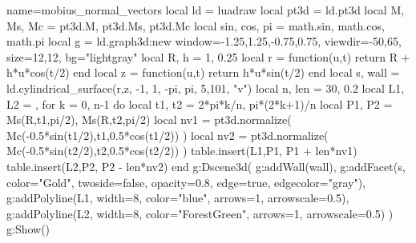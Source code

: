 \documentclass{standalone} %
\begin{document}
\begin{luadraw}{name=mobius_normal_vectors}
local ld = luadraw
local pt3d = ld.pt3d
local M, Ms, Mc = pt3d.M, pt3d.Ms, pt3d.Mc
local sin, cos, pi = math.sin, math.cos, math.pi
local g = ld.graph3d:new{ window={-1.25,1.25,-0.75,0.75}, viewdir={-50,65}, 
    size={12,12}, bg="lightgray" }
local R, h = 1, 0.25
local r = function(u,t)
    return R + h*u*cos(t/2)
end
local z = function(u,t)
    return h*u*sin(t/2)
end
local s, wall = ld.cylindrical_surface(r,z, -1, 1, -pi, pi, {5,101}, "v")
local n, len = 30, 0.2
local L1, L2 = {}, {}
for k = 0, n-1 do
    local t1, t2 = 2*pi*k/n, pi*(2*k+1)/n
    local P1, P2 = Ms(R,t1,pi/2), Ms(R,t2,pi/2)
    local nv1 = pt3d.normalize( Mc(-0.5*sin(t1/2),t1,0.5*cos(t1/2)) )
    local nv2 = pt3d.normalize( Mc(-0.5*sin(t2/2),t2,0.5*cos(t2/2)) )
    table.insert(L1,{P1, P1 + len*nv1})
    table.insert(L2,{P2, P2 - len*nv2})
end
g:Dscene3d( g:addWall(wall),
    g:addFacet(s, {color="Gold", twoside=false, opacity=0.8, edge=true, edgecolor="gray"}),
    g:addPolyline(L1, {width=8, color="blue", arrows=1, arrowscale=0.5}),
    g:addPolyline(L2, {width=8, color="ForestGreen", arrows=1, arrowscale=0.5})
    )
g:Show()
\end{luadraw}
\end{document}
